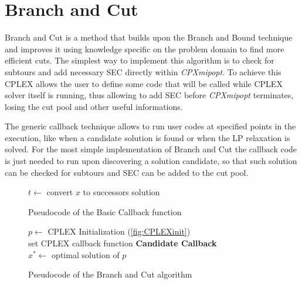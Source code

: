 
\section{Branch and Cut}
Branch and Cut is a method that builds upon the Branch and Bound technique and improves it using knowledge specific on the problem domain to find more efficient cuts.
The simplest way to implement this algorithm is to check for subtours and add necessary SEC directly within \textit{CPXmipopt}.
To achieve this CPLEX allows the user to define some code that will be called while CPLEX solver itself is running, thus allowing to add SEC before \textit{CPXmipopt} terminates, losing the cut pool and other useful informations.

The generic callback technique allows to run user codes at specified points in the execution, like when a candidate solution is found or when the LP relaxation is solved.
For the most simple implementation of Branch and Cut the callback code is just needed to run upon discovering a solution candidate, so that such solution can be checked for subtours and SEC can be added to the cut pool.

\begin{figure}[htbp]
	\begin{algorithm}[H]
		\vspace{2mm}
		$t \gets$ convert $x$ to successors solution\\
	\end{algorithm}
	\caption{Pseudocode of the Basic Callback function} \label{fig:callbackBase}
\end{figure}
\begin{figure}[htbp]
	\begin{algorithm}[H]
		\vspace{2mm}
		$p \gets$ CPLEX Initialization (\ref{fig:CPLEXinit})\\
		set CPLEX callback function \textbf{Candidate Callback}\\
		$x^* \gets$ optimal solution of $p$\\
	\end{algorithm}
	\caption{Pseudocode of the Branch and Cut algorithm} \label{fig:branchAndCut}
\end{figure}

